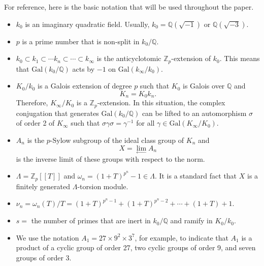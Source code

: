 \documentclass{amsart}
\begin{document}
For reference, here is the basic notation that will be used throughout the paper.
\begin{itemize}
\item $k_0$ is an imaginary quadratic field. Usually, $k_0=\mathbb Q(\sqrt{-1})$ or $\mathbb Q(\sqrt{-3})$.

\item $p$ is a prime number that is non-split in $k_0/\mathbb Q$.

\item $
k_0\subset k_1 \subset \cdots k_n \subset \cdots \subset k_{\infty}
$
is the anticyclotomic $\mathbb Z_p$-extension of $k_0$. This means that $\text{Gal}(k_0/\mathbb Q)$ acts by $-1$ on $\text{Gal}(k_{\infty}/k_0)$. 

\item $K_0/k_0$ is a Galois extension of degree $p$ such that $K_0$ is Galois over $\mathbb Q$ and
$$
K_n = K_0k_n.
$$
Therefore, $K_{\infty}/K_0$ is a $\mathbb Z_p$-extension. In this situation,
the complex conjugation that generates $\text{Gal}(k_0/\mathbb Q)$ can be lifted to
an automorphism $\sigma$ of order 2 of $K_{\infty}$ such that $\sigma \gamma\sigma = \gamma^{-1}$
for all $\gamma\in \text{Gal}(K_{\infty}/K_0)$.

\item $A_n$ is the $p$-Sylow subgroup of the ideal class group of $K_n$ and 
$$
X=\lim_{\leftarrow} A_n
$$
is the inverse limit of these groups with respect to the norm.

\item $\Lambda=\mathbb Z_p[[T]]$ and $\omega_n=(1+T)^{p^n}-1\in \Lambda$.
It is a standard fact that $X$ is a finitely generated $\Lambda$-torsion module.
\item $
\nu_n = \omega_n(T)/T = (1+T)^{p^n-1} + (1+T)^{p^n-2} +\cdots + (1+T) + 1.
$

\item $s=$ the number of primes that are inert in $k_0/\mathbb Q$ and ramify in $K_0/k_0$.

\item We use the notation $A_1 = 27\times 9^2\times 3^7$, for example, to indicate that $A_1$ is a product of a cyclic group
of order 27, two cyclic groups of order 9, and seven groups of order 3.
\end{itemize}
\medskip
\end{document}
